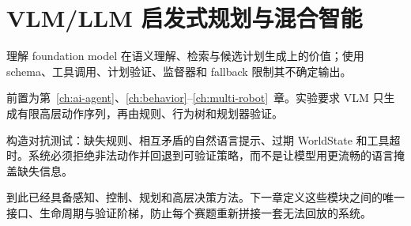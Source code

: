 \chapter{VLM/LLM 启发式规划与混合智能}
\label{ch:vlm}

\begin{learningobjectives}
理解 foundation model 在语义理解、检索与候选计划生成上的价值；使用 schema、工具调用、计划验证、监督器和 fallback 限制其不确定输出。
\end{learningobjectives}

\begin{prerequisites}
前置为第~\ref{ch:ai-agent}、\ref{ch:behavior}--\ref{ch:multi-robot}~章。实验要求 VLM 只生成有限高层动作序列，再由规则、行为树和规划器验证。
\end{prerequisites}


\begin{aiverify}
构造对抗测试：缺失规则、相互矛盾的自然语言提示、过期 WorldState 和工具超时。系统必须拒绝非法动作并回退到可验证策略，而不是让模型用更流畅的语言掩盖缺失信息。
\end{aiverify}

\begin{chaptertransition}
到此已经具备感知、控制、规划和高层决策方法。下一章定义这些模块之间的唯一接口、生命周期与验证阶梯，防止每个赛题重新拼接一套无法回放的系统。
\end{chaptertransition}

